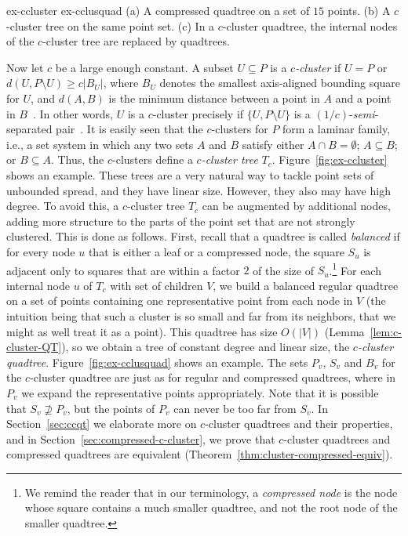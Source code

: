 \documentclass[11pt]{paper}
\begin{document}
  
     {ex-ccluster} {ex-cclusquad} 
    { (a) A compressed quadtree on a set of $15$ points.
      (b) A $c$-cluster tree on the same point set.
      (c) In a $c$-cluster quadtree, the internal nodes of the $c$-cluster tree are replaced by quadtrees.      
    }    

    Now let $c$ be a large enough constant.
    A subset $U \subseteq P$ is a \emph{$c$-cluster} if $U = P$ or
    $d(U, P \setminus U) \geq c |B_U|$, where $B_U$ denotes the
    smallest axis-aligned bounding square
    for $U$, and $d(A,B)$ is the minimum distance between a point in $A$
    and a point in $B$~\cite{KrznaricLe95,KrznaricLe98}. In other words, 
    $U$ is a $c$-cluster precisely if $\{U, P \setminus U\}$ is a
    $(1/c)$-\emph{semi}-separated pair~\cite{HarPeled11,Varadarajan98}.
    It is easily seen that the $c$-clusters for $P$ form a laminar
    family, i.e., a set system in which any two sets $A$ and $B$  satisfy either
    $A \cap B = \emptyset$; $A \subseteq B$; or $B \subseteq A$.
    Thus, the $c$-clusters define a \emph{$c$-cluster tree} $T_c$.
    Figure~\ref {fig:ex-ccluster} shows an example.
    These trees are a very natural way to tackle
    point sets of unbounded spread, and they have linear size. However,
    they also may have high degree. To avoid this, a $c$-cluster tree
    $T_c$ can be augmented by additional nodes, adding more structure
    to the parts of the point set that are not strongly clustered.
    This is done as follows. First, recall that a 
      quadtree is called \emph {balanced} if for every node 
      $u$ that is either a leaf or a compressed node,
     the square $S_u$ is adjacent only to squares that are within a factor $2$
     of the size of $S_u$.\footnote{We remind the reader that in our 
     terminology,
     a \emph{compressed node} is the node whose square contains a much
     smaller quadtree, and not the root node of the smaller quadtree.}
    For each
    internal node $u$ of $T_c$ with set of children $V$, we
    build a balanced regular quadtree on a set of points
    containing one representative point from each node in $V$
    (the intuition being that such a cluster is so small and far from its
    neighbors, that we might as well treat it as a point). This
    quadtree has size $O(|V|)$ (Lemma~\ref{lem:c-cluster-QT}), so
    we obtain a tree of constant degree and linear size,
    the \emph {$c$-cluster quadtree}.
    Figure~\ref {fig:ex-cclusquad} shows an example.
    The sets $P_v$, $S_v$ and $B_v$
    for the $c$-cluster quadtree are just as for regular and compressed
    quadtrees, where in $P_v$ we expand the representative points
    appropriately.
    Note that it is possible that $S_v \nsupseteq P_v$, but the points 
    of $P_v$ can never be too far from $S_v$.
    In Section~\ref {sec:ccqt} we elaborate more on $c$-cluster quadtrees 
    and their properties, and in Section~\ref{sec:compressed-c-cluster}, 
    we prove that $c$-cluster quadtrees and compressed quadtrees
    are equivalent (Theorem~\ref{thm:cluster-compressed-equiv}). 
\end{document}
